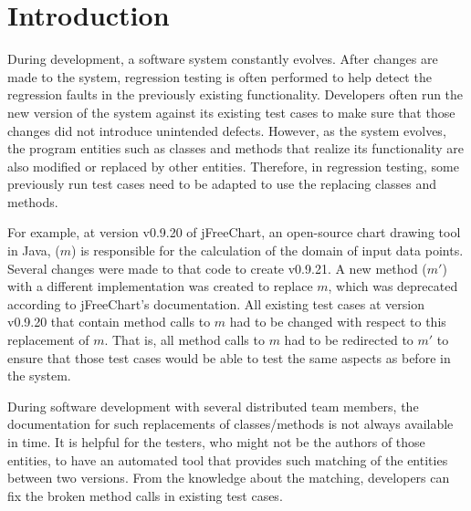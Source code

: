 \section{Introduction}


During development, a software system constantly evolves. After changes
are made to the system, regression testing is often performed to help
detect the regression faults in the previously existing
functionality. Developers often run the new version of the system
against its existing test cases to make sure that those changes did
not introduce unintended defects. However, as the system evolves, the
program entities such as classes and methods that realize its
functionality are also modified or replaced by other entities. Therefore,
in regression testing, some previously run test cases need to be
adapted to use the replacing classes and methods.


For example, at version v0.9.20 of jFreeChart, an open-source chart
drawing tool in Java,
 ($m$) is
responsible for the calculation of the domain of input data
points. Several changes were made to that code to create v0.9.21. A
new method  ($m'$)
with a different implementation was created to replace $m$, which was
deprecated according to jFreeChart's documentation. All existing test
cases at version v0.9.20 that contain method calls to $m$ had to be
changed with respect to this replacement of $m$. That is, all method
calls to $m$ had to be redirected to $m'$ to ensure that those test
cases would be able to test the same aspects as before in the system.

During software development with several distributed team members, the
documentation for such replacements of classes/methods is not always
available in time. It is helpful for the testers, who might not be the
authors of those entities, to have an automated tool that provides
such matching of the entities between two versions. From the knowledge
about the matching, developers can fix the broken method calls in
existing test cases.


